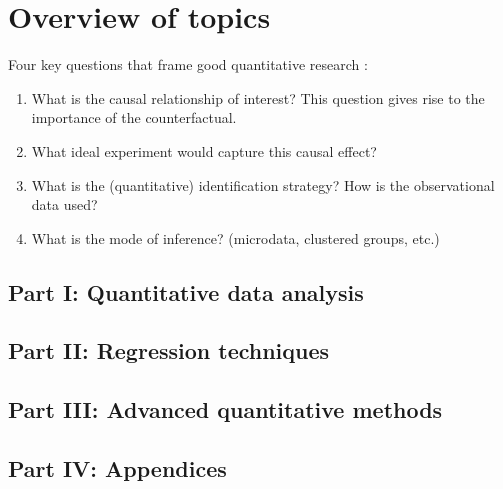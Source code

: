 \section{Overview of topics}
Four key questions that frame good quantitative research \citep[cf.][]{Angrist2009a}:

\begin{enumerate}
\item What is the causal relationship of interest? This question gives rise to the importance of the counterfactual.
\item What ideal experiment would capture this causal effect?
\item What is the (quantitative) identification strategy? How is the observational data used?
\item What is the mode of inference? (microdata, clustered groups, etc.)
\end{enumerate}



\subsection{Part I: Quantitative data analysis}
\subsection{Part II: Regression techniques}
\subsection{Part III: Advanced quantitative methods}
\subsection{Part IV: Appendices} 

\pagebreak
\renewcommand\bibname{Further reading}
\begin{subappendices}

\end{subappendices} 